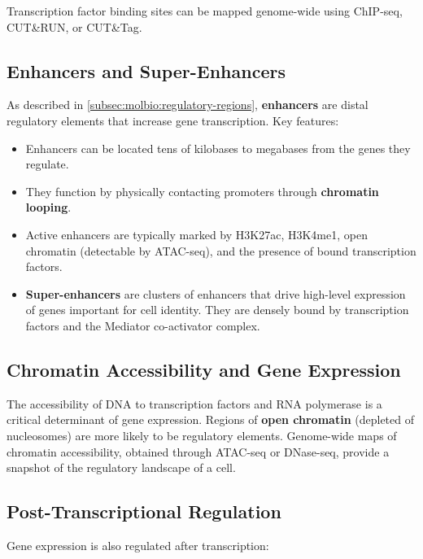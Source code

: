 Transcription factor binding sites can be mapped genome-wide using \acrshort{ChIP-seq}, CUT\&RUN, or CUT\&Tag.

\subsection{Enhancers and Super-Enhancers}
\label{subsec:molbio:enhancers}

As described in \cref{subsec:molbio:regulatory-regions}, \textbf{enhancers} are distal regulatory elements that increase gene transcription. Key features:

\begin{itemize}[itemsep=2pt]
  \item Enhancers can be located tens of kilobases to megabases from the genes they regulate.
  \item They function by physically contacting promoters through \textbf{chromatin looping}.
  \item Active enhancers are typically marked by H3K27ac, H3K4me1, open chromatin (detectable by \acrshort{ATAC-seq}), and the presence of bound transcription factors.
  \item \textbf{Super-enhancers} are clusters of enhancers that drive high-level expression of genes important for cell identity. They are densely bound by transcription factors and the Mediator co-activator complex.
\end{itemize}

\subsection{Chromatin Accessibility and Gene Expression}
\label{subsec:molbio:chromatin-access}

The accessibility of DNA to transcription factors and RNA polymerase is a critical determinant of gene expression. Regions of \textbf{open chromatin} (depleted of nucleosomes) are more likely to be regulatory elements. Genome-wide maps of chromatin accessibility, obtained through \acrshort{ATAC-seq} or DNase-seq, provide a snapshot of the regulatory landscape of a cell.

\subsection{Post-Transcriptional Regulation}
\label{subsec:molbio:post-transcriptional}

Gene expression is also regulated after transcription:

